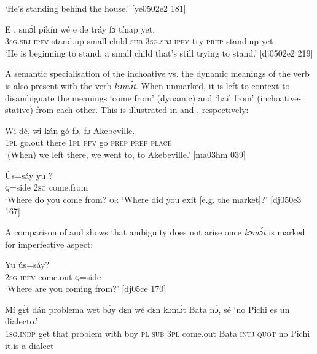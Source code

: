 \glt ‘He’s standing behind the house.’ [ye0502e2 181]
\z


\ea%
    \label{ex:key:307}
    \gll E     ,  smɔ́l  pikín  wé  e    de  tráy
fɔ    tínap  yet.\\
\textsc{3sg.sbj}  \textsc{ipfv}  stand.up  small  child  \textsc{sub}  \textsc{3sg.sbj}  \textsc{ipfv}  try
\textsc{prep}    stand.up  yet\\

\glt ‘He is beginning to stand, a small child that’s still trying to stand.’ [dj0502e2 219]
\z

A semantic specialisation of the inchoative vs. the dynamic meanings of the verb is also present with the verb \textit{kɔmɔ́t}. When unmarked, it is left to context to disambiguate the meanings ‘come from’ (dynamic) and ‘hail from’ (inchoative-stative) from each other. This is illustrated in  and , respectively:


\ea%
    \label{ex:key:308}
    \gll Wi    dé,    wi  kán  gó  fɔ,  fɔ  Akebeville.\\
\textsc{1pl}  go.out  there  \textsc{1pl}  \textsc{pfv}  go  \textsc{prep}  \textsc{prep}  \textsc{place}\\

\glt ‘(When) we left there, we went to, to Akebeville.’ [ma03hm 039]
\z


\ea%
    \label{ex:key:309}
    \gll \'{U}s=sáy  yu  ?\\
\textsc{q}=side  \textsc{2sg}  come.from\\

\glt ‘Where do you come from? \textsc{or} ‘Where did you exit [e.g. the market]?’ [dj050e3 167]
\z

A comparison of  and  shows that ambiguity does not arise once \textit{kɔmɔ́t} is marked for imperfective aspect:


\ea%
    \label{ex:key:310}
    \gll Yu       ús=sáy?\\
\textsc{2sg}  \textsc{ipfv}  come.out  \textsc{q}=side\\

\glt ‘Where are you coming from?’ [dj05ce 170]
\z


\ea%
    \label{ex:key:311}
    \gll Mí    gɛ́t  dán  problema  wet    bɔ́y  dɛn  wé  dɛn  kɔmɔ́t
Bata    nɔ́,  sé    ‘no  Pichi  es  un  dialecto.’\\
\textsc{1sg.indp}  get  that  problem    with    boy  \textsc{pl}  \textsc{sub}  \textsc{3pl}  come.out
Bata    \textsc{intj}  \textsc{quot}    no  Pichi  it.is  a  dialect\\

